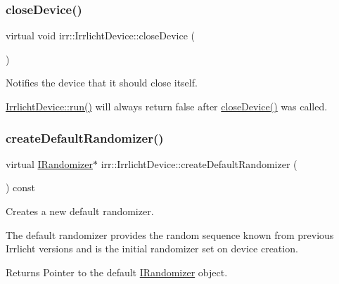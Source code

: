 \subsubsection{\texorpdfstring{close\+Device()}{closeDevice()}\hspace{0.1cm}{\footnotesize\ttfamily [3/3]}}
{\footnotesize\ttfamily virtual void irr\+::\+Irrlicht\+Device\+::close\+Device (\begin{DoxyParamCaption}{ }\end{DoxyParamCaption})\hspace{0.3cm}{\ttfamily [pure virtual]}}



Notifies the device that it should close itself. 

\hyperlink{classirr_1_1IrrlichtDevice_a0489f8151dc43f6f41503ffb5a160b35}{Irrlicht\+Device\+::run()} will always return false after \hyperlink{classirr_1_1IrrlichtDevice_a08c97937e0f60f98d443b397a7c60e18}{close\+Device()} was called. \mbox{\label{classirr_1_1IrrlichtDevice_a267b069ea2c5f5b008fd7afa5b931ee9}} 
\subsubsection{\texorpdfstring{create\+Default\+Randomizer()}{createDefaultRandomizer()}\hspace{0.1cm}{\footnotesize\ttfamily [1/3]}}
{\footnotesize\ttfamily virtual \hyperlink{classirr_1_1IRandomizer}{I\+Randomizer}$\ast$ irr\+::\+Irrlicht\+Device\+::create\+Default\+Randomizer (\begin{DoxyParamCaption}{ }\end{DoxyParamCaption}) const\hspace{0.3cm}{\ttfamily [pure virtual]}}



Creates a new default randomizer. 

The default randomizer provides the random sequence known from previous Irrlicht versions and is the initial randomizer set on device creation. \begin{DoxyReturn}{Returns}
Pointer to the default \hyperlink{classirr_1_1IRandomizer}{I\+Randomizer} object. 
\end{DoxyReturn}
\mbox{\label{classirr_1_1IrrlichtDevice_a267b069ea2c5f5b008fd7afa5b931ee9}} 
